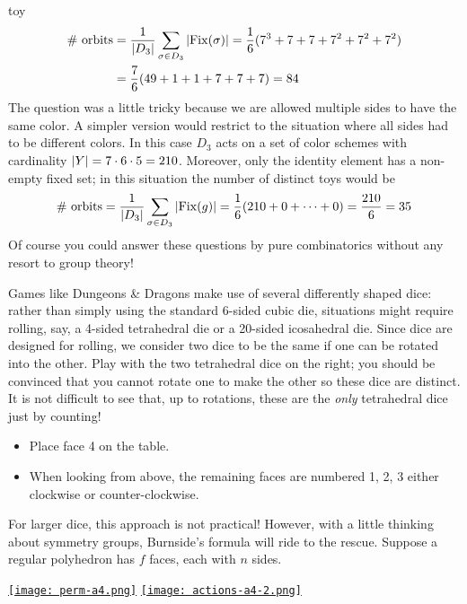 \begin{example}{}{toy}
\begin{align*}
		\text{\# orbits}
		&=\frac 1{\left| D_3\right|}\sum_{\sigma\in D_3}\left| \operatorname{Fix}(\sigma)\right|
			=\frac 16(7^3+7+7+7^2+7^2+7^2)\\
		&=\frac 76(49+1+1+7+7+7)=84
	\end{align*}
	The question was a little tricky because we are allowed multiple sides to have the same color. A simpler version would restrict to the situation where all sides had to be different colors. In this case $D_3$ acts on a set of color schemes with cardinality $\left| Y\right|=7\cdot 6\cdot 5=210$. Moreover, only the identity element has a non-empty fixed set; in this situation the number of distinct toys would be
	\[
		\text{\# orbits}
		=\frac 1{\left| D_3\right|}\sum_{\sigma\in D_3}\left| \operatorname{Fix}(g)\right|
		=\frac 16(210+0+\cdots+0)
		=\frac{210}6=35
	\]
	Of course you could answer these questions by pure combinatorics without any resort to group theory!
\end{example}

\goodbreak


\begin{minipage}[t]{0.69\linewidth}\vspace{-10pt}
	Games like Dungeons \& Dragons make use of several differently shaped dice: rather than simply using the standard 6-sided cubic die, situations might require rolling, say, a 4-sided tetrahedral die or a 20-sided icosahedral die.\smallbreak
	Since dice are designed for rolling, we consider two dice to be the same if one can be rotated into the other. Play with the two tetrahedral dice on the right; you should be convinced that you cannot rotate one to make the other so these dice are distinct.\smallbreak
	It is not difficult to see that, up to rotations, these are the \emph{only} tetrahedral dice just by counting!
	\begin{itemize}
	  \item Place face 4 on the table.
	  \item When looking from above, the remaining faces are numbered 1, 2, 3 either clockwise or counter-clockwise. 
	\end{itemize}
	For larger dice, this approach is not practical! However, with a little thinking about symmetry groups, Burnside's formula will ride to the rescue.\smallbreak
	Suppose a regular polyhedron has $f$ faces, each with $n$ sides.
	\end{minipage}\hfill\begin{minipage}[t]{0.3\linewidth}\vspace{-20pt}
	\flushright
		\href{https://www.math.uci.edu/~ndonalds/math120a/perm-a4.html}{\texttt{[image: perm-a4.png]}}\bigbreak
	  \href{https://www.math.uci.edu/~ndonalds/math120a/actions-a4-2.html}{\texttt{[image: actions-a4-2.png]}}
\end{minipage}\par


